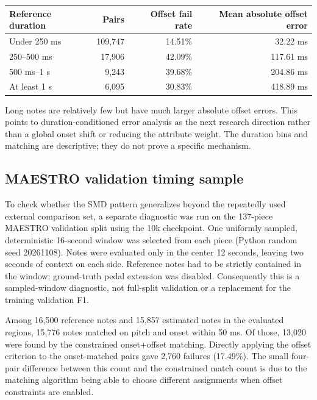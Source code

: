 \documentclass[11pt]{article}
\begin{document}
\begin{center}
\begin{tabular}{lrrr}
\toprule
\textbf{Reference duration} & \textbf{Pairs} & \textbf{Offset fail rate} &
\textbf{Mean absolute offset error} \\
\midrule
Under 250 ms & 109,747 & 14.51\% & 32.22 ms \\
250--500 ms & 17,906 & 42.09\% & 117.61 ms \\
500 ms--1 s & 9,243 & 39.68\% & 204.86 ms \\
At least 1 s & 6,095 & 30.83\% & 418.89 ms \\
\bottomrule
\end{tabular}
\end{center}

Long notes are relatively few but have much larger absolute offset errors.
This points to duration-conditioned error analysis as the next research
direction rather than a global onset shift or reducing the attribute weight.
The duration bins and matching are descriptive; they do not prove a specific
mechanism.

\subsection{MAESTRO validation timing sample}

To check whether the SMD pattern generalizes beyond the repeatedly used
external comparison set, a separate diagnostic was run on the 137-piece
MAESTRO validation split using the 10k checkpoint. One uniformly sampled,
deterministic 16-second window was selected from each piece (Python random
seed 20261108). Notes were evaluated only in the center 12 seconds, leaving
two seconds of context on each side. Reference notes had to be strictly
contained in the window; ground-truth pedal extension was disabled.
Consequently this is a sampled-window diagnostic, not full-split validation
or a replacement for the training validation F1.

Among 16,500 reference notes and 15,857 estimated notes in the evaluated
regions, 15,776 notes matched on pitch and onset within 50 ms. Of those,
13,020 were found by the constrained onset+offset matching. Directly applying
the offset criterion to the onset-matched pairs gave 2,760 failures (17.49\%).
The small four-pair difference between this count and the constrained match
count is due to the matching algorithm being able to choose different
assignments when offset constraints are enabled.
\end{document}
